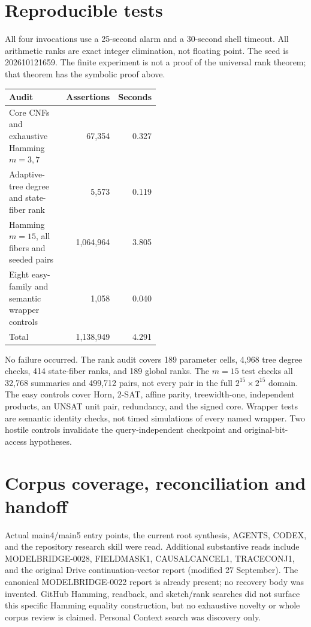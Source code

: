 \documentclass[11pt]{article}
\begin{document}
\section{Reproducible tests}
All four invocations use a 25-second alarm and a 30-second shell timeout.
All arithmetic ranks are exact integer elimination, not floating point.
The seed is 202610121659. The finite experiment is not a proof of the
universal rank theorem; that theorem has the symbolic proof above.
\begin{center}
\begin{tabular}{p{0.50\linewidth}rr}
\toprule Audit & Assertions & Seconds\\\midrule
Core CNFs and exhaustive Hamming $m=3,7$ & 67,354 & 0.327\\
Adaptive-tree degree and state-fiber rank & 5,573 & 0.119\\
Hamming $m=15$, all fibers and seeded pairs & 1,064,964 & 3.805\\
Eight easy-family and semantic wrapper controls & 1,058 & 0.040\\\midrule
Total & 1,138,949 & 4.291\\\bottomrule
\end{tabular}
\end{center}
No failure occurred. The rank audit covers 189 parameter cells, 4,968 tree
degree checks, 414 state-fiber ranks, and 189 global ranks. The $m=15$ test
checks all 32,768 summaries and 499,712 pairs, not every pair in the full
$2^{15}\times2^{15}$ domain. The easy controls cover Horn, 2-SAT, affine
parity, treewidth-one, independent products, an UNSAT unit pair, redundancy,
and the signed core. Wrapper tests are semantic identity checks, not timed
simulations of every named wrapper. Two hostile controls invalidate the
query-independent checkpoint and original-bit-access hypotheses.

\section{Corpus coverage, reconciliation and handoff}
Actual main4/main5 entry points, the current root synthesis, AGENTS, CODEX,
and the repository research skill were read. Additional substantive reads
include MODELBRIDGE-0028, FIELDMASK1, CAUSALCANCEL1, TRACECONJ1, and the original
Drive continuation-vector report (modified 27 September). The canonical
MODELBRIDGE-0022 report is already present; no recovery body was invented.
GitHub Hamming, readback, and sketch/rank searches did not surface this
specific Hamming equality construction, but no exhaustive novelty or whole
corpus review is claimed. Personal Context search was discovery only.
\end{document}
